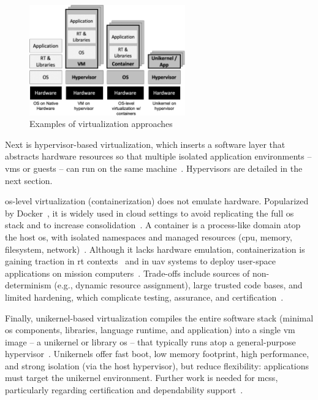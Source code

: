 \begin{figure}[!hbtp]
  \centering
  \includegraphics[width=0.6\textwidth]{./img/jpg/virt-approaches-exs} 
  \caption[Examples of virtualization approaches]{Examples of virtualization approaches~\cite{cinque2022virtualizing}\footnotemark}%
  \label{fig:virt-approaches-exs}
\end{figure}
%
%

Next is hypervisor-based virtualization, which inserts a software layer that
abstracts hardware resources so that multiple isolated application
environments -- \glspl{vm} or guests -- can run on the same
machine~\cite{cinque2022virtualizing}. Hypervisors are detailed in the next
section.

\gls{os}-level virtualization (containerization) does not emulate hardware.
Popularized by Docker~\cite{sollfrank_evaluating_2021,kumar_economically_2016},
it is widely used in cloud settings to avoid replicating the full \gls{os} stack
and to increase consolidation~\cite{cinque2022virtualizing}. A container is a
process-like domain atop the host \gls{os}, with isolated namespaces and managed
resources (\gls{cpu}, memory, filesystem, network)~\cite{cinque2022virtualizing}.
Although it lacks hardware emulation, containerization is gaining traction in
\gls{rt} contexts~\cite{xilinxRunX,struhar2020real} and in \gls{uav} systems to
deploy user-space applications on mission computers~\cite{auterion-sw-services}.
Trade-offs include sources of non-determinism (e.g., dynamic resource
assignment), large trusted code bases, and limited hardening, which complicate
testing, assurance, and certification~\cite{cinque2022virtualizing}.

Finally, unikernel-based virtualization compiles the entire software stack
(minimal \gls{os} components, libraries, language runtime, and application) into
a single \gls{vm} image -- a unikernel or library \gls{os} -- that typically runs atop
a general-purpose hypervisor~\cite{cinque2022virtualizing}. Unikernels offer
fast boot, low memory footprint, high performance, and strong isolation (via the
host hypervisor), but reduce flexibility: applications must target the unikernel
environment. Further work is needed for \glspl{mcs}, particularly regarding
certification and dependability support~\cite{cinque2022virtualizing}.

